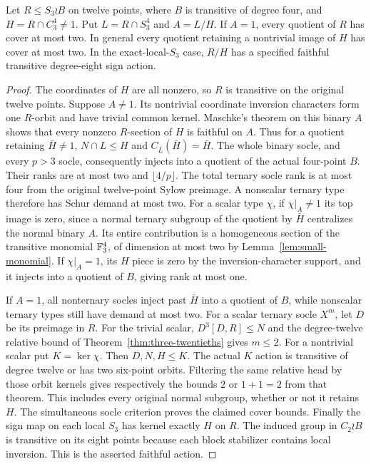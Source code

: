 \begin{lemma}
\label{lem:four-ternary-top}
Let $R\leq S_3\wr B$ on twelve points, where $B$ is transitive of
degree four, and $H=R\cap C_3^4\ne1$. Put
$L=R\cap S_3^4$ and $A=L/H$. If $A=1$, every quotient of $R$ has
cover at most two. In general every quotient retaining a nontrivial
image of $H$ has cover at most two. In the exact-local-$S_3$ case,
$R/H$ has a specified faithful transitive degree-eight sign action.
\end{lemma}
\begin{proof}
The coordinates of $H$ are all nonzero, so $R$ is transitive on the
original twelve points. Suppose $A\ne1$. Its nontrivial coordinate
inversion characters form one $R$-orbit and have trivial common
kernel. Maschke's theorem on this binary $A$ shows that every nonzero
$R$-section of $H$ is faithful on $A$. Thus for a quotient retaining
$\bar H\ne1$, $N\cap L\leq H$ and
$C_{\bar L}(\bar H)=\bar H$. The whole binary socle, and every
$p>3$ socle, consequently injects into a quotient of the actual
four-point $B$. Their ranks are at most two and $\lfloor4/p\rfloor$.
The total ternary socle rank is at most four from the original
twelve-point Sylow preimage. A nonscalar ternary type therefore has
Schur demand at most two. For a scalar type $\chi$, if
$\chi|_A\ne1$ its top image is zero, since a normal ternary subgroup
of the quotient by $\bar H$ centralizes the normal binary $A$.
Its entire contribution is a homogeneous section of the transitive
monomial $\mathbb F_3^4$, of dimension at most two by
Lemma~\ref{lem:small-monomial}. If $\chi|_A=1$, its $H$ piece is
zero by the inversion-character support, and it injects into a
quotient of $B$, giving rank at most one.

If $A=1$, all nonternary socles inject past $\bar H$ into a quotient
of $B$, while nonscalar ternary types still have demand at most two.
For a scalar ternary socle $X^m$, let $D$ be its preimage in $R$.
For the trivial scalar, $D^3[D,R]\leq N$ and the degree-twelve
relative bound of Theorem~\ref{thm:three-twentieths} gives $m\leq2$.
For a nontrivial scalar put $K=\ker\chi$. Then $D,N,H\leq K$.
The actual $K$ action is transitive of degree twelve or has two
six-point orbits. Filtering the same relative head by those orbit
kernels gives respectively the bounds $2$ or $1+1=2$ from that
theorem. This includes every original normal subgroup, whether or
not it retains $H$. The simultaneous socle criterion proves the
claimed cover bounds. Finally the sign map on each local $S_3$
has kernel exactly $H$ on $R$. The induced group in $C_2\wr B$
is transitive on its eight points because each block stabilizer
contains local inversion. This is the asserted faithful action.
\end{proof}

